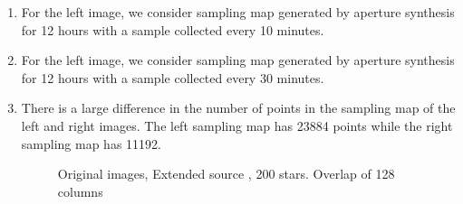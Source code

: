 \begin{enumerate}
\item For the left image, we consider sampling map generated by aperture synthesis for 12 hours with a sample collected every 10 minutes.
\item For the left image, we consider sampling map generated by aperture synthesis for 12 hours with a sample collected every 30 minutes.
\item There is a large difference in the number of points in the sampling map of the left and right images. The left sampling map has 23884 points while the right sampling map has 11192.
\begin{figure}[h!]
\hspace{0.4in}
		\hspace{0.2in}
\caption [Original images, Extended source, 200 stars]{Original images, Extended source , 200 stars. Overlap of 128 columns}
\label{fig:expt61}
\end{figure}

\begin{figure}[h!]


\end{figure}
\end{enumerate}
